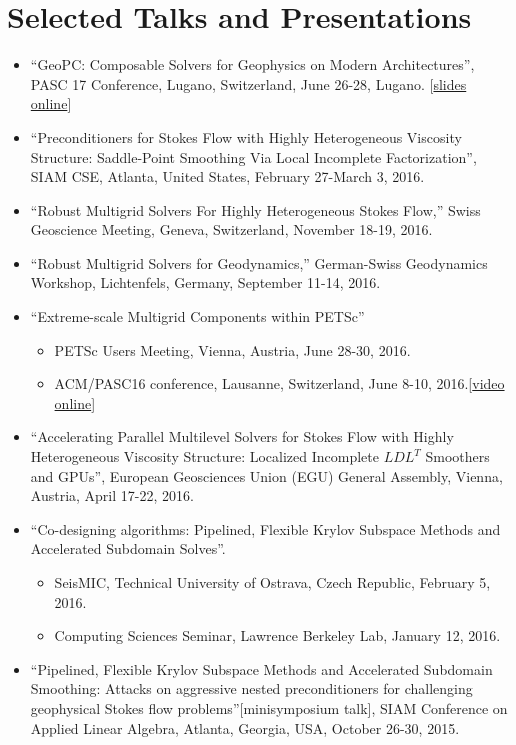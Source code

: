 \section*{Selected Talks and Presentations}
\begin{itemize}
  \item ``GeoPC: Composable Solvers for Geophysics on Modern Architectures'', PASC 17 Conference, Lugano, Switzerland, June 26-28, Lugano. [\href{http://patricksanan.com/talks/SANAN_patrick_PASC17.pdf}{slides online}]
  \item ``Preconditioners for Stokes Flow with Highly Heterogeneous Viscosity Structure: Saddle-Point Smoothing Via Local Incomplete Factorization'', SIAM CSE, Atlanta, United States, February 27-March 3, 2016.
    \item ``Robust Multigrid Solvers For Highly Heterogeneous Stokes Flow,'' Swiss Geoscience Meeting, Geneva, Switzerland, November 18-19, 2016.
\item ``Robust Multigrid Solvers for Geodynamics,'' German-Swiss Geodynamics Workshop, Lichtenfels, Germany, September 11-14, 2016.
  \item ``Extreme-scale Multigrid Components within PETSc''
  \begin{itemize}
    \item PETSc Users Meeting, Vienna, Austria, June 28-30, 2016.
    \item ACM/PASC16 conference, Lausanne, Switzerland, June 8-10, 2016.[\href{http://insidehpc.com/2016/06/extreme-scale-multigrid/}{video online}]
  \end{itemize}
  \item ``Accelerating Parallel Multilevel Solvers for Stokes Flow with Highly Heterogeneous Viscosity Structure: Localized Incomplete $LDL^T$ Smoothers and GPUs'', European Geosciences Union (EGU) General Assembly, Vienna, Austria, April 17-22, 2016.
  \item ``Co-designing algorithms: Pipelined, Flexible Krylov Subspace Methods and  Accelerated Subdomain Solves''.
  \begin{itemize}
      \item SeisMIC, Technical University of Ostrava, Czech Republic, February 5, 2016.
      \item Computing Sciences Seminar, Lawrence Berkeley Lab, January 12, 2016.
  \end{itemize}
  \item ``Pipelined, Flexible Krylov Subspace Methods and Accelerated Subdomain Smoothing: Attacks on aggressive nested preconditioners for challenging geophysical Stokes flow problems''[minisymposium talk], SIAM Conference on Applied Linear Algebra, Atlanta, Georgia, USA, October 26-30, 2015.

\end{itemize}
